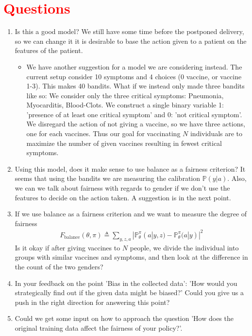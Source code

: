 \documentclass[a4paper, 12pt]{extarticle}
\begin{document}
\section{\textcolor{red}{Questions}}
\begin{enumerate}
    \item Is this a good model? We still have some time before the postponed delivery, so we can change it it is desirable to base the action given to a patient on the features of the patient. 
    \begin{itemize}
        \item We have another suggestion for a model we are considering instead. 
        The current setup consider 10 symptoms and 4 choices (0 vaccine, or vaccine 1-3). 
        This makes 40 bandits. 
        What if we instead only made three bandits like so: We consider only the three critical symptoms: Pneumonia, Myocarditis, Blood-Clots. 
        We construct a single binary variable 1: 'presence of at least one critical symptom' and 0: 'not critical symptom'. 
        We disregard the action of not giving a vaccine, so we have three actions, one for each vaccines. 
        Thus our goal for vaccinating $N$ individuals are to maximize the number of given vaccines resulting in fewest critical symptoms. 
    \end{itemize}
    \item Using this model, does it make sense to use balance as a fairness criterion? 
    It seems that using the bandits we are measuring the calibration $\mathbb{P}(y|a)$. 
    Also, we can we talk about fairness with regards to gender if we don't use the features to decide on the action taken. A suggestion is in the next point. 
    \item If we use balance as a fairness criterion and we want to measure the degree of fairness 
    \begin{align*}
        F_{\text{balance}}(\theta, \pi) \triangleq \sum_{y,z,a} |\mathbb{P}_{\theta}^{\pi} (a|y,z) - \mathbb{P}_{\theta}^{\pi}(a|y)|^2
    \end{align*}  
    Is it okay if after giving vaccines to $N$ people, we divide the individual into groups with similar vaccines and symptoms, and then look at the difference in the count of the two genders?
    \item In your feedback on the point 'Bias in the collected data': 'How would you strategically find out if the given data might be biased?' Could you give us a push in the right direction for answering this point?
    \item Could we get some input on how to approach the question 'How does the original training data affect the fairness of your policy?'.
\end{enumerate}
\end{document}
